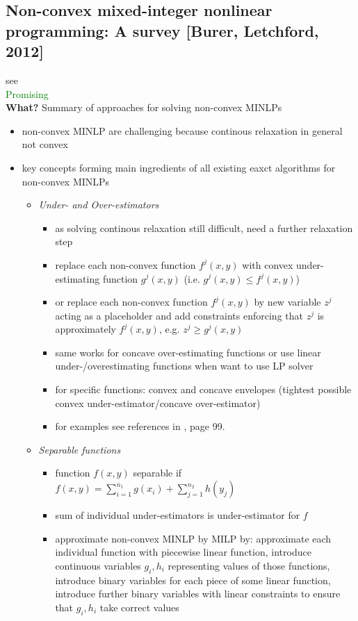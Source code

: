 \documentclass{article}
\begin{document}
\subsection{Non-convex mixed-integer nonlinear programming: A survey [Burer, Letchford, 2012]}
see \cite{burer2012non}\\
\textcolor{green}{Promising}\\
\textbf{What?} Summary of approaches for solving non-convex MINLPs
\begin{itemize}
\item non-convex MINLP are challenging because  continous relaxation in general not convex
\item key concepts forming main ingredients of all existing eaxct algorithms for non-convex MINLPs
	\begin{itemize}
	\item \emph{Under- and Over-estimators}
		\begin{itemize}
		\item as solving continous relaxation still difficult, need a further relaxation step
		\item replace each non-convex function $f^j(x,y)$ with convex under-estimating function $g^j(x,y)$ (i.e. $g^j(x,y) \leq f^j(x,y)$)
		\item or replace each non-convex function $f^j(x,y)$ by new variable $z^j$ acting as a placeholder and add constraints enforcing that $z^j$ is approximately  $f^j(x,y)$, e.g. $z^j \geq g^j(x,y)$
		\item same works for concave over-estimating functions or use linear under-/overestimating functions when want to use LP solver
		\item for specific functions: convex and concave envelopes (tightest possible convex under-estimator/concave over-estimator)
		\item for examples see references in \cite{burer2012non}, page 99.
		\end{itemize}
	\item \emph{Separable functions}
		\begin{itemize}
		\item function $f(x,y)$ separable if $f(x,y) = \sum_{i=1}^{n_1}g(x_i) + \sum_{j=1}^{n_2}h(y_j)$
		\item sum of individual under-estimators is under-estimator for $f$
		\item approximate non-convex MINLP by MILP by: approximate each individual function with piecewise linear function, introduce continuous variables $g_i, h_i$ representing values of those functions, introduce binary variables for each piece of some linear function, introduce further binary variables with linear constraints to ensure that $g_i, h_i$ take correct values

\end{itemize}
\end{itemize}
\end{itemize}
\end{document}
